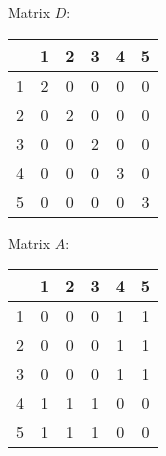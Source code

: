 \documentclass[12pt,letterpaper]{article}
\begin{document}
Matrix $D$:
\begin{tabular}{|*{6}{c|}}
      \hline
      & 1 & 2 & 3 & 4 & 5\\
      \hline
    1 & 2 & 0 & 0 & 0 & 0\\
      \hline
    2 & 0 & 2 & 0 & 0 & 0\\
      \hline
    3 & 0 & 0 & 2 & 0 & 0\\
      \hline
    4 & 0 & 0 & 0 & 3 & 0\\
      \hline
    5 & 0 & 0 & 0 & 0 & 3\\
      \hline
\end{tabular}


Matrix $A$:
\begin{tabular}{|*{6}{c|}}
      \hline
      & 1 & 2 & 3 & 4 & 5\\
      \hline
    1 & 0 & 0 & 0 & 1 & 1\\
      \hline
    2 & 0 & 0 & 0 & 1 & 1\\
      \hline
    3 & 0 & 0 & 0 & 1 & 1\\
      \hline
    4 & 1 & 1 & 1 & 0 & 0\\
      \hline
    5 & 1 & 1 & 1 & 0 & 0\\
      \hline
\end{tabular}
\end{document}
